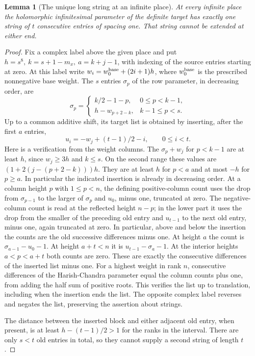\documentclass[a4paper,11pt]{article}
\newtheorem{lemma}[proposition]{Lemma}
\theoremstyle{definition}
\theoremstyle{remark}
\numberwithin{equation}{section}
\begin{document}
\begin{lemma}[The unique long string at an infinite place]
\leavevmode\label{lem:archstring787}
At every infinite place the holomorphic infinitesimal
parameter of the definite target has exactly one
string of \(t\) consecutive entries of spacing one.
That string cannot be extended at either end.
\end{lemma}
\begin{proof}
Fix a complex label above the given place and put
\(h=s^8,\ k=s+1-m_x,\ a=k+j-1\), with indexing of
the source entries starting at zero. At this label
write \(w_i=w_0^{\rm base}+(2i+1)h\), where
\(w_0^{\rm base}\) is the prescribed nonnegative
base weight. The \(s\) entries \(\sigma_p\) of the
row parameter, in decreasing order, are
\[
 \sigma_p=
 \begin{cases}
 k/2-1-p,&0\le p<k-1,\\
 h-w_{p+2-k},& k-1\le p<s .
 \end{cases}
\]
Up to a common additive shift, its target list is
obtained by inserting, after the first \(a\) entries,
\[
     u_i=-w_j+(t-1)/2-i,\qquad 0\le i<t .
\]
Here is a verification from the weight columns. The
\(\sigma_p+w_j\) for \(p<k-1\) are at least \(h\),
since \(w_j\ge3h\) and \(k\le s\). On the second
range these values are
\((1+2(j-(p+2-k)))h\). They are at least \(h\)
for \(p<a\) and at most \(-h\) for \(p\ge a\).
In particular the indicated insertion is already
in decreasing order. At a column height \(p\) with
\(1\le p<n\), the defining positive-column count
uses the drop from \(\sigma_{p-1}\) to the larger
of \(\sigma_p\) and \(u_0\), minus one, truncated
at zero. The negative-column count is read at the
reflected height \(n-p\); in the lower part it uses
the drop from the smaller of the preceding old
entry and \(u_{t-1}\) to the next old entry, minus
one, again truncated at zero. In particular, above
and below the insertion the counts are the old
successive differences minus one. At height \(a\)
the count is \(\sigma_{a-1}-u_0-1\). At height
\(a+t<n\) it is \(u_{t-1}-\sigma_a-1\). At the
interior heights \(a<p<a+t\) both counts are zero.
These are exactly the consecutive differences of
the inserted list minus one. For a highest weight
in rank \(n\), consecutive differences of the
Harish-Chandra parameter equal the column counts
plus one, from adding the half sum of positive
roots. This verifies the list up to translation,
including when the insertion ends the list. The
opposite complex label reverses and negates the
list, preserving the assertion about strings.

The distance between the inserted block and either
adjacent old entry, when present, is at least
\(h-(t-1)/2>1\) for the ranks in the interval.
There are only \(s<t\) old entries in total, so
they cannot supply a second string of length \(t\).
\end{proof}
\end{document}
